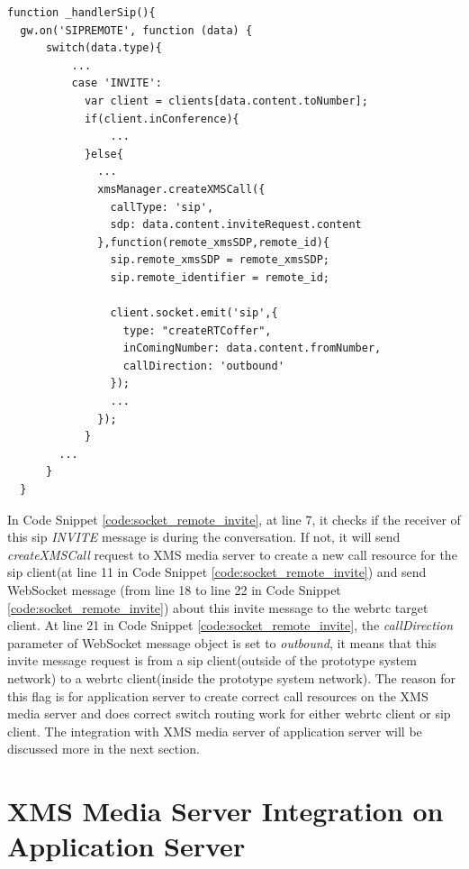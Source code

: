 \begin{lstlisting}[caption={SIPREMOTE event handler for INVITE message},label={code:socket_remote_invite}]
function _handlerSip(){
  gw.on('SIPREMOTE', function (data) {
      switch(data.type){
          ...
          case 'INVITE':
            var client = clients[data.content.toNumber];
            if(client.inConference){
                ...
            }else{
              ...
              xmsManager.createXMSCall({
                callType: 'sip',
                sdp: data.content.inviteRequest.content
              },function(remote_xmsSDP,remote_id){
                sip.remote_xmsSDP = remote_xmsSDP;
                sip.remote_identifier = remote_id;

                client.socket.emit('sip',{
                  type: "createRTCoffer",
                  inComingNumber: data.content.fromNumber,
                  callDirection: 'outbound'
                });
                ...
              });
            }
        ...
      }
  }
\end{lstlisting}

\par In Code Snippet \ref{code:socket_remote_invite}, at line 7, it checks if the receiver of this \gls{sip} \textit{INVITE} message is during the conversation. If not, it will send \textit{createXMSCall} request to XMS media server to create a new call resource for the \gls{sip} client(at line 11 in Code Snippet \ref{code:socket_remote_invite}) and send WebSocket message (from line 18 to line 22 in Code Snippet \ref{code:socket_remote_invite}) about this invite message to the \gls{webrtc} target client. At line 21 in Code Snippet \ref{code:socket_remote_invite}, the \textit{callDirection} parameter of WebSocket message object is set to \textit{outbound}, it means that this invite message request is from a \gls{sip} client(outside of the prototype system network) to a \gls{webrtc} client(inside the prototype system network). The reason for this flag is for application server to create correct call resources on the XMS media server and does correct switch routing work for either \gls{webrtc} client or \gls{sip} client. The integration with XMS media server of application server will be discussed more in the next section.

\section{XMS Media Server Integration on Application Server}

